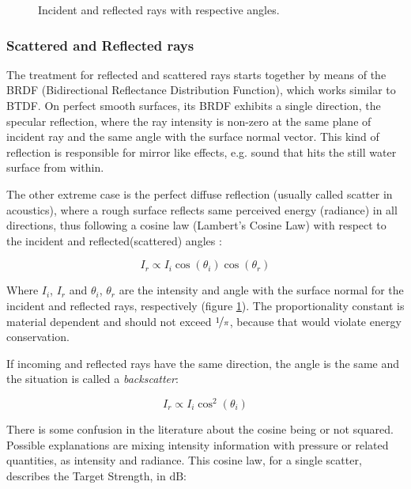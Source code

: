 \begin{figure}[h]
	\centering
	
	\caption{Incident and reflected rays with respective angles.}
	\label{fig:ray_reflect}
\end{figure}


\subsubsection{Scattered and Reflected rays}
\label{sss:rays}
The treatment for reflected and scattered rays starts together by means of the
BRDF (Bidirectional Reflectance Distribution
Function)\cite{blake1995remote,miller2015real,durany2015analytical}, which works
similar to BTDF. On perfect smooth surfaces, its BRDF exhibits a single
direction, the specular reflection, where the ray intensity is non-zero at the
same plane of incident ray and the same angle with the surface normal vector.
This kind of reflection is responsible for mirror like effects, e.g. sound that hits
the still water surface from within\cite{LURTON,Etter2013}.

The other extreme case is the perfect diffuse reflection (usually called scatter
in acoustics), where a rough surface reflects same perceived energy (radiance)
in all directions, thus following a cosine law (Lambert's Cosine Law) with
respect to the incident and reflected(scattered) angles
\cite{united1977geometrical,cox2004acoustic}:

\begin{equation}
\label{eq:lambertian}
I_r \propto	 I_i \cos(\theta_i) \cos(\theta_r)
\end{equation}

Where $I_i$,  $I_r$ and $\theta_i$, $\theta_r$ are the intensity and angle with
the surface normal for the incident and reflected rays,
respectively (figure \ref{fig:ray_reflect}). The proportionality constant is
material dependent and should not exceed $\nicefrac{1}{\pi}$, because that would violate
energy conservation.

If incoming and reflected rays have the same direction, the angle is the same
and the situation is called a \textit{backscatter}:

\begin{equation*}
I_r \propto I_i \cos^2(\theta_i)
\end{equation*}

There is some confusion in the literature about the cosine being or not
squared\cite{durany2015analytical,cox2006tutorial,cox2004acoustic,jones2009modelling,LURTON,Etter2013}.
Possible explanations are mixing intensity information with pressure
or related quantities, as intensity and radiance. This cosine law, for a single
scatter, describes the Target Strength, in $\text{dB}$:

